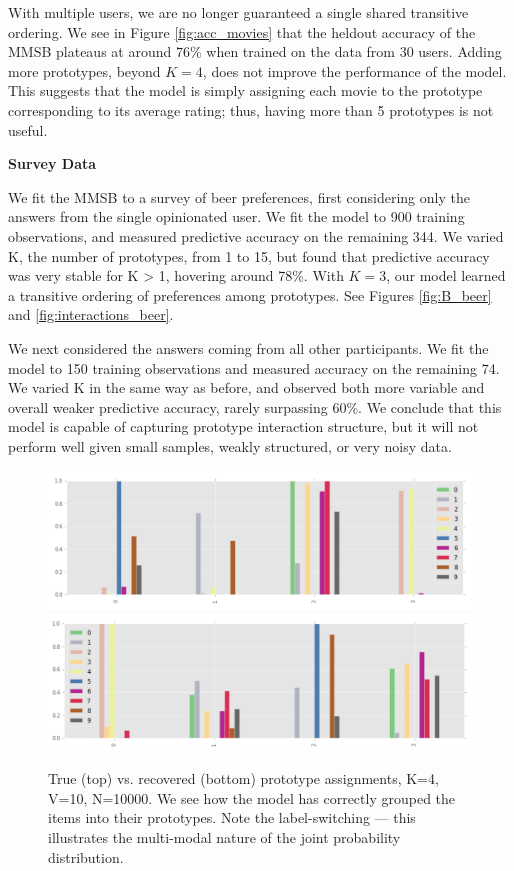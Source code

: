 With multiple users, we are no longer guaranteed a single shared transitive
ordering.
We see in Figure \ref{fig:acc_movies} that the heldout accuracy of the
MMSB plateaus at around $76\%$ when trained on the data from 30 users.
Adding more prototypes, beyond $K=4$, does not improve the
performance of the model. This suggests that the model is simply assigning each
movie to the prototype corresponding to its average rating; thus, having more
than 5 prototypes is not useful.

\bigskip
\textbf{Survey Data}

We fit the MMSB to a survey of beer preferences, first considering only the answers from the single opinionated user.
We fit the model to 900 training observations, and measured predictive accuracy on the remaining 344.
We varied K, the number of prototypes, from 1 to 15, but found that predictive accuracy was very stable for K > 1, hovering around 78\%.
With $K=3$, our model learned a transitive ordering of preferences among prototypes. See Figures \ref{fig:B_beer} and \ref{fig:interactions_beer}.

We next considered the answers coming from all other participants.
We fit the model to 150 training observations and measured accuracy on the remaining 74.
We varied K in the same way as before, and observed both more variable and overall weaker predictive accuracy, rarely surpassing 60\%.
We conclude that this model is capable of capturing prototype interaction structure, but it will not perform well given small samples, weakly structured, or very noisy data.

\begin{figure}
\includegraphics[width=\textwidth]{images/pi}
\includegraphics[width=\textwidth]{images/gamma}
\caption{True (top) vs. recovered (bottom) prototype assignments, K=4, V=10, N=10000. We see how the model has correctly grouped the items into their prototypes. Note the label-switching --- this illustrates the multi-modal nature of the joint probability distribution.}
\label{fig:pi_v_gamma} 
\end{figure}

